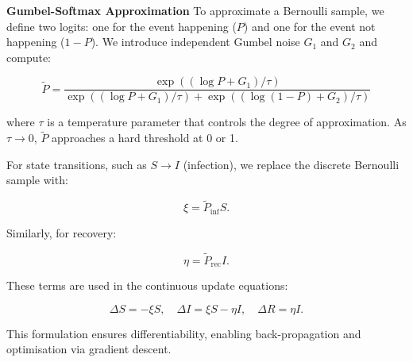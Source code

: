 \documentclass[12pt]{article}
\begin{document}
{\bf Gumbel-Softmax Approximation} To approximate a Bernoulli sample, we define two logits: one for the event happening (\( P \)) and one for the event not happening (\( 1 - P \)). We introduce independent Gumbel noise \( G_1 \) and \( G_2 \) and compute:

\[
\tilde{P} = \frac{\exp\left((\log P + G_1)/\tau\right)}{\exp\left((\log P + G_1)/\tau\right) + \exp\left((\log (1-P) + G_2)/\tau\right)}
\]

where \( \tau \) is a temperature parameter that controls the degree of approximation. As \( \tau \to 0 \), \( \tilde{P} \) approaches a hard threshold at 0 or 1.

For state transitions, such as \( S \to I \) (infection), we replace the discrete Bernoulli sample with:

\[
\xi = \tilde{P}_{\text{inf}} S.
\]

Similarly, for recovery:

\[
\eta = \tilde{P}_{\text{rec}} I.
\]

These terms are used in the continuous update equations:

\[
\Delta S = -\xi S, \quad \Delta I = \xi S - \eta I, \quad \Delta R = \eta I.
\]

This formulation ensures differentiability, enabling back-propagation and optimisation via gradient descent.
\end{document}

